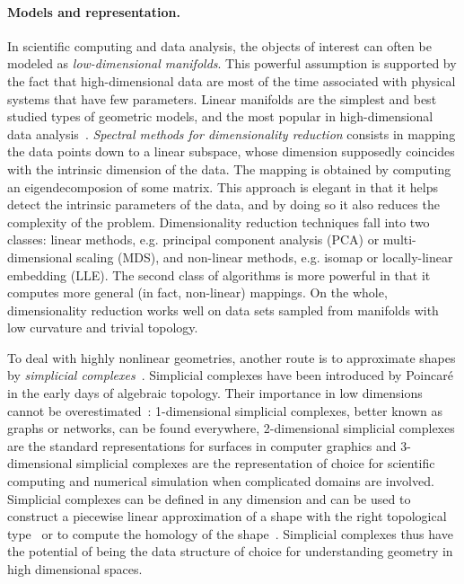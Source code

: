 
\paragraph{Models and representation.} 
In  scientific computing and data analysis,  the objects of
interest can often be modeled as {\em low-dimensional manifolds}. This powerful assumption is supported by the fact that high-dimensional data are most of the time associated with physical systems that have few parameters.  Linear manifolds are the simplest and best studied types of geometric models, and the most popular in high-dimensional data analysis~\cite{hs-fmmds-2006,lv-nldr-2007}. {\em Spectral methods for dimensionality reduction} consists in mapping the data points down to a linear subspace, whose dimension supposedly coincides with the intrinsic dimension of the data. The mapping is obtained by computing an eigendecomposion of some matrix. This approach is elegant in that it helps detect the intrinsic parameters of the data, and by doing so it also reduces the complexity of the problem. Dimensionality reduction techniques fall into two classes: linear methods, e.g. principal component analysis (PCA) or multi-dimensional scaling (MDS), and non-linear methods, e.g. isomap or locally-linear embedding (LLE). The second class of algorithms is more powerful in that it computes more general (in fact, non-linear) mappings. On the whole, dimensionality reduction works well on data sets sampled from manifolds with low curvature and trivial topology. %

 To deal with highly nonlinear geometries, another route is to approximate shapes by {\em simplicial complexes}~\cite{hh-ct-2010}.  Simplicial complexes have been introduced by Poincar\'e in the early days of algebraic topology. Their importance in low dimensions cannot be overestimated~: 1-dimensional simplicial complexes, better known as graphs or networks, can be found everywhere,  2-dimensional simplicial complexes are the standard representations for surfaces in computer graphics and 3-dimensional simplicial complexes are the representation of choice for scientific computing and numerical simulation when complicated domains are involved. Simplicial complexes can be defined in any dimension and can be used to construct a piecewise linear approximation of a shape with the right topological type~\cite{geometrica-7142i} or to 
compute the homology of the shape~\cite{hh-ct-2010}. Simplicial complexes thus have the potential of being the data structure of choice for understanding geometry in high dimensional spaces. 


